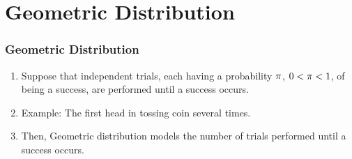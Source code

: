 \documentclass[compress]{beamer}
\newcommand{\sqBullet}[1]{  {\tiny \tiny \tiny \qBoxCol{#1!60}{ }} }
\begin{document}
\section{Geometric Distribution   }



\begin{frame}\frametitle{Geometric Distribution}
\vspace{-.1in}
\begin{enumerate}
\item Suppose that independent trials, each having a probability $\pi$,
$0 < \pi <1$, of being a success, are performed until a success occurs.
\item Example: The first head in tossing coin several times.
\item Then, Geometric distribution models the number of trials performed until a success occurs.
\end{enumerate}




\end{frame}
\end{document}
